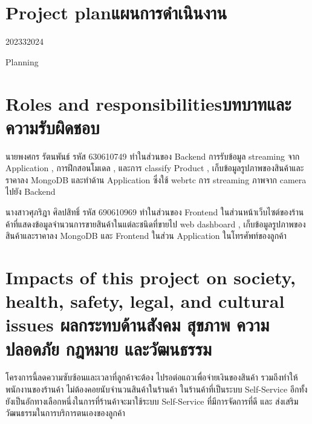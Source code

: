 
\section{\ifenglish Project plan\else แผนการดำเนินงาน\fi}
\begin{table}[h]
    \begin{plan}{1}{2023}{3}{2024}
    \end{plan}
    
    \caption[Planning]{Planning}
    \label{table:Planning}
    \end{table}
 

\section{\ifenglish Roles and responsibilities\else บทบาทและความรับผิดชอบ\fi}
นายพงศกร รัตนพันธ์ รหัส 630610749 ทำในส่วนของ Backend การรับข้อมูล streaming จาก Application   , การฝึกสอนโมเดล , และการ classify Product  , เก็บข้อมูลรูปภาพของสินค้าและราคาลง MongoDB 
และทำด้าน Application  ซึ่งใช้ webrtc  การ streaming ภาพจาก camera  ไปยัง Backend \newline

นางสาวศุภริฎา  ศิลปสิทธิ์    รหัส  690610969 ทำในส่วนของ  Frontend ในส่วนหน้าเว็บไซต์ของร้านค้าที่แสดงข้อมูลจำนวนการขายสินค้าในแต่ละชนิดที่ขายไป web dashboard , เก็บข้อมูลรูปภาพของสินค้าและราคาลง MongoDB 
และ Frontend  ในส่วน Application ในโทรศัพท์ของลูกค้า 
\section{\ifenglish%
Impacts of this project on society, health, safety, legal, and cultural issues
\else%
ผลกระทบด้านสังคม สุขภาพ ความปลอดภัย กฎหมาย และวัฒนธรรม
\fi}

โครงการนี้ลดความซับซ้อนและเวลาที่ลูกค้าจะต้อง ไปรอต่อแถวเพื่อจ่ายเงินของสินค้า
รวมถึงทำให้พนักงานของร้านค้า ไม่ต้องคอยนับจำนวนสินค้าในร้านค้า  ในร้านค้าที่เป็นระบบ Self-Service  อีกทั้งยังเป็นอักทางเลือกหนึ่งในการที่ร้านค้าจะมาใช้ระบบ Self-Service ที่มีการจัดการที่ดี และ ส่งเสริมวัฒนธรรมในการบริการตนเองของลูกค้า
